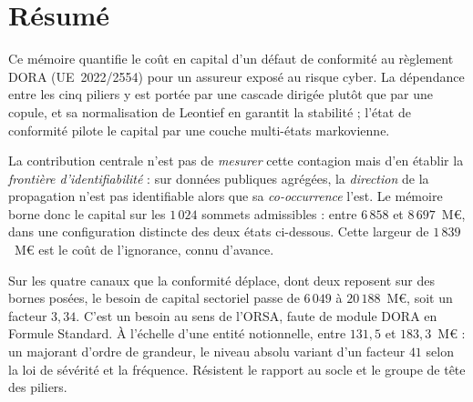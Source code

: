 \chapter*{Résumé}

Ce mémoire quantifie le coût en capital d'un défaut de conformité au règlement DORA
(UE~2022/2554) pour un assureur exposé au risque cyber. La dépendance entre les cinq piliers y
est portée par une cascade dirigée plutôt que par une copule, et sa normalisation de Leontief en
garantit la stabilité ; l'état de conformité pilote le capital par une couche multi-états
markovienne.

La contribution centrale n'est pas de \emph{mesurer} cette contagion mais d'en établir la
\emph{frontière d'identifiabilité} : sur données publiques agrégées, la \emph{direction} de la
propagation n'est pas identifiable alors que sa \emph{co-occurrence} l'est. Le mémoire borne donc
le capital sur les $1\,024$ sommets admissibles : entre $6\,858$ et $8\,697$~M\euro{}, dans une
configuration distincte des deux états ci-dessous. Cette largeur de $1\,839$~M\euro{} est le coût
de l'ignorance, connu d'avance.

Sur les quatre canaux que la conformité déplace, dont deux reposent sur des bornes posées, le
besoin de capital sectoriel passe de $6\,049$ à $20\,188$~M\euro, soit un facteur $3{,}34$. C'est
un besoin au sens de l'ORSA, faute de module DORA en Formule Standard. À l'échelle d'une entité
notionnelle, entre $131{,}5$ et $183{,}3$~M\euro{} : un majorant d'ordre de grandeur, le niveau
absolu variant d'un facteur $41$ selon la loi de sévérité et la fréquence. Résistent le rapport au
socle et le groupe de tête des piliers.

